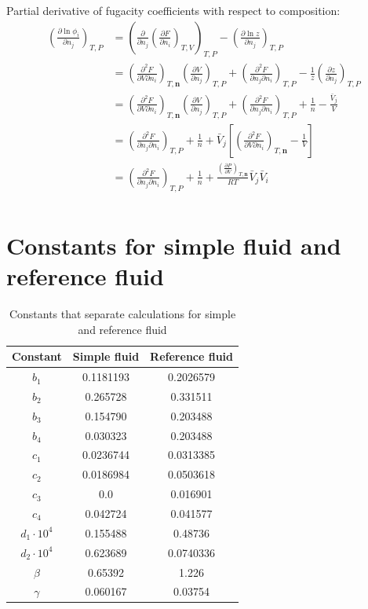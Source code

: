 \documentclass[english]{../thermomemo/thermomemo}
\numberwithin{equation}{section}
\newcommand*{\pd}[2]{\frac{\partial #1}{\partial #2}}
\newcommand*{\pder}[2]{\left(\frac{\partial #1}{\partial #2}\right)}
\newcommand*{\pdcross}[3]{\left(\frac{\partial^2 #1}{\partial #2 \partial #3}\right)}
\begin{document}
Partial derivative of fugacity coefficients with respect to composition:
\begin{equation}
\begin{split}
\pder{\ln \phi_i}{n_j}_{T, P} 
& = \left(\pd{}{n_j} \pder{F}{n_i}_{T,V} \right)_{T, P} - \pder{\ln z}{n_j}_{T,P} \\
& = \pdcross{F}{V}{n_i}_{T,\textbf{n}} \pder{V}{n_j}_{T,P} + \pdcross{F}{n_j}{n_i}_{T,P} - \frac{1}{z} \pder{z}{n_j}_{T,P} \\
& = \pdcross{F}{V}{n_i}_{T,\textbf{n}} \pder{V}{n_j}_{T,P} + \pdcross{F}{n_j}{n_i}_{T,P} + \frac{1}{n} - \frac{\bar{V}_j}{V} \\
& = \pdcross{F}{n_j}{n_i}_{T,P} + \frac{1}{n} + \bar{V}_j \left[\pdcross{F}{V}{n_i}_{T,\textbf{n}} - \frac{1}{V} \right] \\
& = \pdcross{F}{n_j}{n_i}_{T,P} + \frac{1}{n} + \frac{\pder{P}{V}_{T,\textbf{n}}}{RT} \bar{V}_j \bar{V}_i \\
\end{split}
\end{equation}

\section{Constants for simple fluid and reference fluid}
\label{app:constants}
\begin{table}[h!]
\begin{center}
\caption{Constants that separate calculations for simple and reference fluid}
\label{tab:constants}
\begin{tabular}{c c c}
\hline
Constant & Simple fluid & Reference fluid \\
\hline
$b_1$	& 0.1181193	& 0.2026579 \\
$b_2$ 	& 0.265728	& 0.331511	\\
$b_3$	& 0.154790 	& 0.203488	\\
$b_4$	& 0.030323 	& 0.203488 	\\
$c_1$	& 0.0236744	& 0.0313385	\\
$c_2$	& 0.0186984 & 0.0503618	\\
$c_3$	& 0.0		& 0.016901	\\
$c_4$	& 0.042724	& 0.041577	\\
$d_1 \cdot 10^4$	& 0.155488  & 0.48736 	\\
$d_2 \cdot 10^4$	& 0.623689 	& 0.0740336\\
$\beta$	& 0.65392	& 1.226		\\
$\gamma$& 0.060167	& 0.03754	\\
\hline
\end{tabular}
\end{center}
\end{table}
\end{document}
